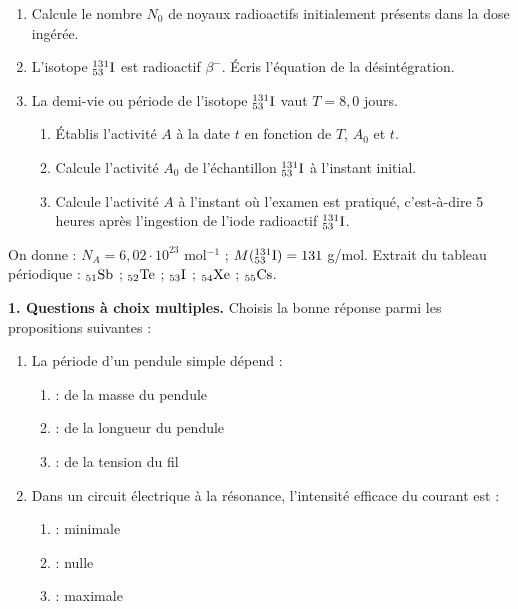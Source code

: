 \documentclass[11pt]{article}
\begin{document}
\begin{enumerate}
  \item Calcule le nombre $N_0$ de noyaux radioactifs initialement présents dans la dose ingérée.
  \item L'isotope $\mathrm{^{131}_{53}I}$ est radioactif $\beta^-$. Écris l'équation de la désintégration.
  \item La demi-vie ou période de l'isotope $\mathrm{^{131}_{53}I}$ vaut $T = 8{,}0$ jours.
  \begin{enumerate}[label=\alph*.]
    \item Établis l'activité $A$ à la date $t$ en fonction de $T$, $A_0$ et $t$.
    \item Calcule l'activité $A_0$ de l'échantillon $\mathrm{^{131}_{53}I}$ à l'instant initial.
    \item Calcule l'activité $A$ à l'instant où l'examen est pratiqué, c'est-à-dire 5 heures après l'ingestion de l'iode radioactif $\mathrm{^{131}_{53}I}$.
  \end{enumerate}
\end{enumerate}
\noindent On donne : $N_A = 6{,}02\cdot10^{23}$ mol$^{-1}$ ; $M(\mathrm{^{131}_{53}I}) = 131$ g/mol. Extrait du tableau périodique : $\mathrm{_{51}Sb}$ ; $\mathrm{_{52}Te}$ ; $\mathrm{_{53}I}$ ; $\mathrm{_{54}Xe}$ ; $\mathrm{_{55}Cs}$.



\noindent\textbf{1. Questions à choix multiples.} Choisis la bonne réponse parmi les propositions suivantes :
\begin{enumerate}[label=\alph*.]
  \item La période d'un pendule simple dépend :
  \begin{enumerate}[label=a\textsubscript{\arabic*}]
    \item : de la masse du pendule
    \item : de la longueur du pendule
    \item : de la tension du fil
  \end{enumerate}
  \item Dans un circuit électrique à la résonance, l'intensité efficace du courant est :
  \begin{enumerate}[label=b\textsubscript{\arabic*}]
    \item : minimale
    \item : nulle
    \item : maximale
  \end{enumerate}
\end{enumerate}
\end{document}
